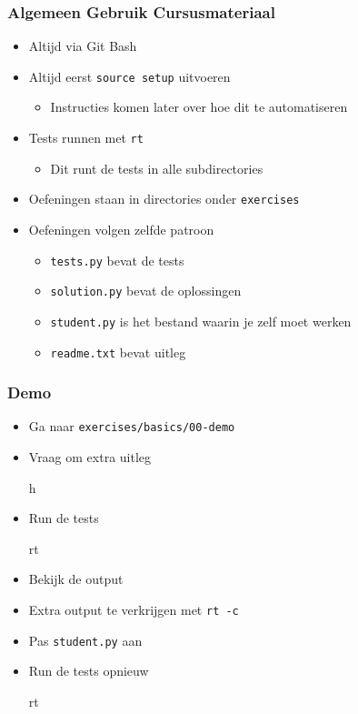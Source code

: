 \begin{frame}
  \frametitle{Algemeen Gebruik Cursusmateriaal}
  \begin{itemize}
    \item Altijd via Git Bash
    \item Altijd eerst \texttt{source setup} uitvoeren
          \begin{itemize}
            \item Instructies komen later over hoe dit te automatiseren
          \end{itemize}
    \item Tests runnen met \texttt{rt}
          \begin{itemize}
            \item Dit runt de tests in alle subdirectories
          \end{itemize}
    \item Oefeningen staan in directories onder \texttt{exercises}
    \item Oefeningen volgen zelfde patroon
          \begin{itemize}
            \item \texttt{tests.py} bevat de tests
            \item \texttt{solution.py} bevat de oplossingen
            \item \texttt{student.py} is het bestand waarin je zelf moet werken
            \item \texttt{readme.txt} bevat uitleg
          \end{itemize}
  \end{itemize}
\end{frame}

\begin{frame}
  \frametitle{Demo}
  \begin{itemize}
    \item Ga naar \texttt{exercises/basics/00-demo}
    \item Vraag om extra uitleg
          \begin{center} \ttfamily
            h
          \end{center}
    \item Run de tests
          \begin{center} \ttfamily
            rt
          \end{center}
    \item Bekijk de output
    \item Extra output te verkrijgen met \texttt{rt -c}
    \item Pas \texttt{student.py} aan
    \item Run de tests opnieuw
          \begin{center} \ttfamily
            rt
          \end{center}
  \end{itemize}
\end{frame}





